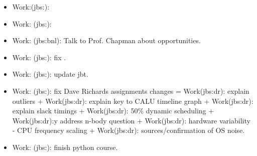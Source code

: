 \begin{itemize}

\tiny  \item \tiny Work:(jbs:): 
\item \tiny Work: (jbs:): 
\item \tiny Work: (jbs:bnl): Talk to Prof. Chapman about opportunities. 
\item \tiny Work: (jbs:): fix . 

\item \tiny Work: (jbs:): update jbt. 

\item \tiny Work: (jbs:): fix Dave Richards assignments changes = Work(jbs:dr): explain outliers +   Work(jbs:dr): explain key to CALU timeline graph +  Work(jbs:dr): explain slack timings +  Work(jbs:dr): 50\% dynamic scheduling  +  Work(jbs:dr):y address n-body question + Work(jbs:dr): hardware variability - CPU frequency scaling + Work(jbs:dr):  sources/confirmation of OS noise. 

\item \tiny Work: (jbs:): finish python course.

\end{itemize}
